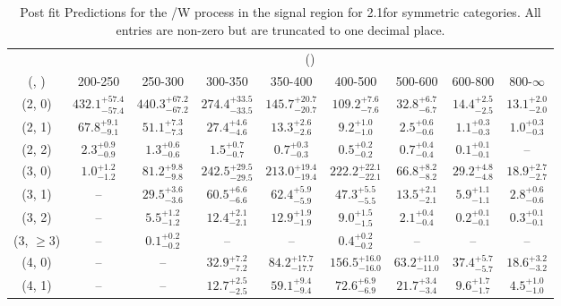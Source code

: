 \begin{table}[h!]
\tiny
\centering
\caption{Post fit Predictions for the \ttbar/W process in the signal region for 2.1\ifb for symmetric categories. All entries are non-zero but are truncated to one decimal place.\label{tab:predseppost_sig_ttw_sym}}
\begin{tabular}
{ccccccccc}
	\hline\hline
	& \multicolumn{8}{c}{\scalht (\gev)} \\ 
	 (\njet,  \nb) & 200-250 & 250-300 & 300-350 & 350-400 & 400-500 & 500-600 & 600-800 & 800-$\infty$ \\ [0.8ex] 
\hline
	(2, 0) & $432.1^{+ 57.4 }_{- 57.4 }$ & $440.3^{+ 67.2 }_{- 67.2 }$ & $274.4^{+ 33.5 }_{- 33.5 }$ & $145.7^{+ 20.7 }_{- 20.7 }$ & $109.2^{+ 7.6 }_{- 7.6 }$ & $32.8^{+ 6.7 }_{- 6.7 }$ & $14.4^{+ 2.5 }_{- 2.5 }$ & $13.1^{+ 2.0 }_{- 2.0 }$ \\[0.5ex] 
	(2, 1) & $67.8^{+ 9.1 }_{- 9.1 }$ & $51.1^{+ 7.3 }_{- 7.3 }$ & $27.4^{+ 4.6 }_{- 4.6 }$ & $13.3^{+ 2.6 }_{- 2.6 }$ & $9.2^{+ 1.0 }_{- 1.0 }$ & $2.5^{+ 0.6 }_{- 0.6 }$ & $1.1^{+ 0.3 }_{- 0.3 }$ & $1.0^{+ 0.3 }_{- 0.3 }$ \\[0.5ex] 
	(2, 2) & $2.3^{+ 0.9 }_{- 0.9 }$ & $1.3^{+ 0.6 }_{- 0.6 }$ & $1.5^{+ 0.7 }_{- 0.7 }$ & $0.7^{+ 0.3 }_{- 0.3 }$ & $0.5^{+ 0.2 }_{- 0.2 }$ & $0.7^{+ 0.4 }_{- 0.4 }$ & $0.1^{+ 0.1 }_{- 0.1 }$ & -- \\[0.5ex] 
	(3, 0) & $1.0^{+ 1.2 }_{- 1.2 }$ & $81.2^{+ 9.8 }_{- 9.8 }$ & $242.5^{+ 29.5 }_{- 29.5 }$ & $213.0^{+ 19.4 }_{- 19.4 }$ & $222.2^{+ 22.1 }_{- 22.1 }$ & $66.8^{+ 8.2 }_{- 8.2 }$ & $29.2^{+ 4.8 }_{- 4.8 }$ & $18.9^{+ 2.7 }_{- 2.7 }$ \\[0.5ex] 
	(3, 1) & -- & $29.5^{+ 3.6 }_{- 3.6 }$ & $60.5^{+ 6.6 }_{- 6.6 }$ & $62.4^{+ 5.9 }_{- 5.9 }$ & $47.3^{+ 5.5 }_{- 5.5 }$ & $13.5^{+ 2.1 }_{- 2.1 }$ & $5.9^{+ 1.1 }_{- 1.1 }$ & $2.8^{+ 0.6 }_{- 0.6 }$ \\[0.5ex] 
	(3, 2) & -- & $5.5^{+ 1.2 }_{- 1.2 }$ & $12.4^{+ 2.1 }_{- 2.1 }$ & $12.9^{+ 1.9 }_{- 1.9 }$ & $9.0^{+ 1.5 }_{- 1.5 }$ & $2.1^{+ 0.4 }_{- 0.4 }$ & $0.2^{+ 0.1 }_{- 0.1 }$ & $0.3^{+ 0.1 }_{- 0.1 }$ \\[0.5ex] 
	(3, $\ge3$) & -- & $0.1^{+ 0.2 }_{- 0.2 }$ & -- & -- & $0.4^{+ 0.2 }_{- 0.2 }$ & -- & -- & -- \\[0.5ex] 
	(4, 0) & -- & -- & $32.9^{+ 7.2 }_{- 7.2 }$ & $84.2^{+ 17.7 }_{- 17.7 }$ & $156.5^{+ 16.0 }_{- 16.0 }$ & $63.2^{+ 11.0 }_{- 11.0 }$ & $37.4^{+ 5.7 }_{- 5.7 }$ & $18.6^{+ 3.2 }_{- 3.2 }$ \\[0.5ex] 
	(4, 1) & -- & -- & $12.7^{+ 2.5 }_{- 2.5 }$ & $59.1^{+ 9.4 }_{- 9.4 }$ & $72.6^{+ 6.9 }_{- 6.9 }$ & $21.7^{+ 3.4 }_{- 3.4 }$ & $9.6^{+ 1.7 }_{- 1.7 }$ & $4.5^{+ 1.0 }_{- 1.0 }$ \\[0.5ex] 

\end{tabular}
\end{table}
